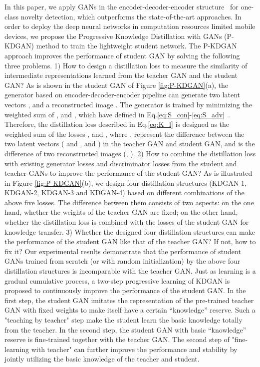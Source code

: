 \documentclass{article}
\begin{document}
	In this paper, we apply GANs in the encoder-decoder-encoder structure~\cite{ganomaly:2018} for one-class novelty detection, which outperforms the state-of-the-art approaches. In order to deploy the deep neural networks in computation resources limited mobile devices, we propose the Progressive Knowledge Distillation with GANs (P-KDGAN) method to train the lightweight student network. The P-KDGAN approach improves the performance of student GAN by solving the following three problems. 
	1) How to design a distillation loss to measure the similarity of intermediate representations learned from the teacher GAN and the student GAN? As is shown in the student GAN of Figure \ref{fig:P-KDGAN}(a), the generator based on encoder-decoder-encoder pipeline can generate two latent vectors ,  and a reconstructed image . The generator is trained by minimizing the weighted sum of ,  and , which have defined in Eq.\ref{eq:S_con}-\ref{eq:S_adv}~\cite{ganomaly:2018}. Therefore, the  distillation loss  described in Eq.\ref{eq:K_l} is designed as the weighted sum of the losses ,  and , where ,  represent the difference between the two latent vectors ( and ,  and ) in the teacher GAN and student GAN, and  is the difference of two reconstructed images (, ). 
	2) How to combine the distillation loss  with existing generator losses  and discriminator losses  from the student and teacher GANs to improve the performance of the student GAN? As is illustrated in Figure \ref{fig:P-KDGAN}(b), we design four distillation structures (KDGAN-\normalsize{\textcircled{\footnotesize{1}}}, KDGAN-\normalsize{\textcircled{\footnotesize{2}}}, KDGAN-\normalsize{\textcircled{\footnotesize{3}}} and KDGAN-\normalsize{\textcircled{\footnotesize{4}}}) based on different combinations of the above five losses. The difference between them consists of two aspects: on the one hand, whether the weights of the teacher GAN are fixed; on the other hand, whether the distillation loss  is combined with the losses  of the student GAN for knowledge transfer. 
	3) Whether the designed four distillation structures can make the performance of the student GAN like that of the teacher GAN? If not, how to fix it? Our experimental results demonstrate that the performance of student GANs trained from scratch (or with random initialization) by the above four distillation structures is incomparable with the teacher GAN. Just as learning is a gradual cumulative process, a two-step progressive learning of KDGAN is proposed to continuously improve the performance of the student GAN. In the first step, the student GAN imitates the representation of the pre-trained teacher GAN with fixed weights to make itself have a certain ``knowledge'' reserve. Such a "teaching by teacher" step make the student learn the basic knowledge totally from the teacher. In the second step, the student GAN with basic ``knowledge'' reserve is fine-trained together with the teacher GAN. The second step of "fine-learning with teacher" can further improve the performance and stability by jointly utilizing the basic knowledge of the teacher and student. 
	
\end{document}
